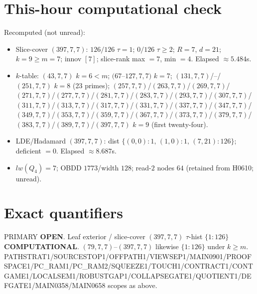 \documentclass[11pt]{article}
\begin{document}
\section*{This-hour computational check}
Recomputed (not unread):
\begin{itemize}
\item Slice-cover $(397,7,7)$: $126/126$ $\tau{=}1$; $0/126$ $\tau{\ge}2$; $R{=}7$, $d{=}21$;
  $k{=}9{\ge}m{=}7$; innov $[7]$; slice-rank max $=7$, min $=4$. Elapsed $\approx5.484$s.
\item $k$-table: $(43,7,7)$ $k{=}6{<}m$; $(67$--$127,7,7)$ $k{=}7$;
  $(131,7,7)$/--/$(251,7,7)$ $k{=}8$ (23 primes); $(257,7,7)$/$(263,7,7)$/$(269,7,7)$/$(271,7,7)$/$(277,7,7)$/$(281,7,7)$/$(283,7,7)$/$(293,7,7)$/$(307,7,7)$/$(311,7,7)$/$(313,7,7)$/$(317,7,7)$/$(331,7,7)$/$(337,7,7)$/$(347,7,7)$/$(349,7,7)$/$(353,7,7)$/$(359,7,7)$/$(367,7,7)$/$(373,7,7)$/$(379,7,7)$/$(383,7,7)$/$(389,7,7)$/$(397,7,7)$ $k{=}9$ (first twenty-four).
\item LDE/Hadamard $(397,7,7)$: dist $\{(0,0){:}1,\,(1,0){:}1,\,(7,21){:}126\}$; deficient $=0$. Elapsed $\approx8.687$s.
\item $lw(Q_4)=7$; OBDD $1773$/width $128$; read-$2$ nodes $64$ (retained from H0610; unread).
\end{itemize}

\section*{Exact quantifiers}
PRIMARY \textbf{OPEN}. Leaf exterior / slice-cover $(397,7,7)$ $\tau$-hist $\{1{:}126\}$ \textbf{COMPUTATIONAL}.
$(79,7,7)$--$(397,7,7)$ likewise $\{1{:}126\}$ under $k{\ge}m$.
PATHSTRAT1/SOURCESTOP1/OFFPATH1/VIEWSEP1/MAIN0901/PROOFSPACE1/PC\_RAM1/PC\_RAM2/SQUEEZE1/TOUCH1/CONTRACT1/CONTGAME1/LOCALSEM1/ROBUSTGAP1/COLLAPSEGATE1/QUOTIENT1/DEFGATE1/MAIN0358/MAIN0658 scopes as above.
\end{document}
